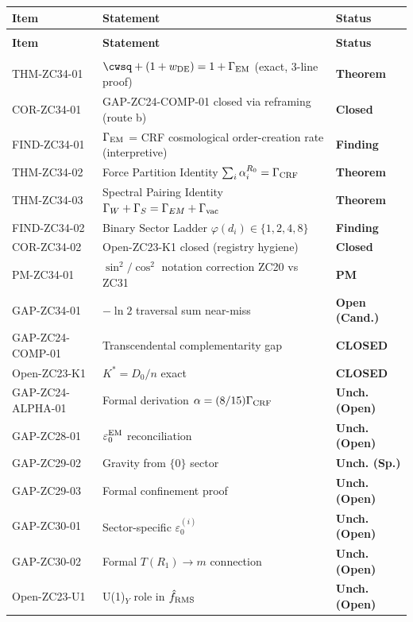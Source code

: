 \documentclass[12pt, a4paper]{article}
\begin{document}
{\small
\setlength{\LTpre}{4pt}
\setlength{\LTpost}{4pt}
\renewcommand{\arraystretch}{1.30}
\begin{longtable}{>{\raggedright\arraybackslash}p{2.7cm}
                  >{\raggedright\arraybackslash}p{7.6cm}
                  >{\centering\arraybackslash}p{1.9cm}}
\toprule
\textbf{Item} & \textbf{Statement} & \textbf{Status}\\
\midrule
\endfirsthead
\multicolumn{3}{l}{\small\textit{(continued)}}\\[4pt]
\toprule
\textbf{Item} & \textbf{Statement} & \textbf{Status}\\
\midrule
\endhead
\midrule
\multicolumn{3}{r}{\small\textit{(continues)}}\\
\endfoot
\bottomrule
\endlastfoot
THM-ZC34-01 & $\cwsq + (1+w_{\rm DE}) = 1 + \Gamma_{\rm EM}$
  (exact, 3-line proof) & \textbf{Theorem}\\
COR-ZC34-01 & GAP-ZC24-COMP-01 closed via reframing
  (route b) & \textbf{Closed}\\
FIND-ZC34-01 & $\Gamma_{\rm EM}$ = CRF cosmological
  order-creation rate (interpretive) & \textbf{Finding}\\
THM-ZC34-02 & Force Partition Identity
  $\sum_i\alpha_i^{R_0} = \Gamma_{\rm CRF}$ & \textbf{Theorem}\\
THM-ZC34-03 & Spectral Pairing Identity
  $\Gamma_W+\Gamma_S = \Gamma_{EM}+\Gamma_{\rm vac}$ & \textbf{Theorem}\\
FIND-ZC34-02 & Binary Sector Ladder
  $\varphi(d_i)\in\{1,2,4,8\}$ & \textbf{Finding}\\
COR-ZC34-02 & Open-ZC23-K1 closed (registry hygiene) & \textbf{Closed}\\
PM-ZC34-01 & $\sin^2/\cos^2$ notation correction ZC20 vs
  ZC31 & \textbf{PM}\\
\midrule
GAP-ZC34-01 & $-\ln 2$ traversal sum near-miss & \textbf{Open (Cand.)}\\
\midrule
GAP-ZC24-COMP-01 & Transcendental complementarity gap
  & \textbf{CLOSED}\\
Open-ZC23-K1 & $K^* = D_0/n$ exact & \textbf{CLOSED}\\
\midrule
GAP-ZC24-ALPHA-01 & Formal derivation $\alpha = (8/15)\Gamma_{\rm CRF}$
  & \textbf{Unch. (Open)}\\
GAP-ZC28-01 & $\varepsilon_0^{\rm EM}$ reconciliation
  & \textbf{Unch. (Open)}\\
GAP-ZC29-02 & Gravity from $\{0\}$ sector
  & \textbf{Unch. (Sp.)}\\
GAP-ZC29-03 & Formal confinement proof
  & \textbf{Unch. (Open)}\\
GAP-ZC30-01 & Sector-specific $\varepsilon_0^{(i)}$
  & \textbf{Unch. (Open)}\\
GAP-ZC30-02 & Formal $T(R_1)\to m$ connection
  & \textbf{Unch. (Open)}\\
Open-ZC23-U1 & U(1)$_Y$ role in $\hat{f}_{\rm RMS}$
  & \textbf{Unch. (Open)}\\
\end{longtable}
}
\vspace{-6pt}
\end{document}
